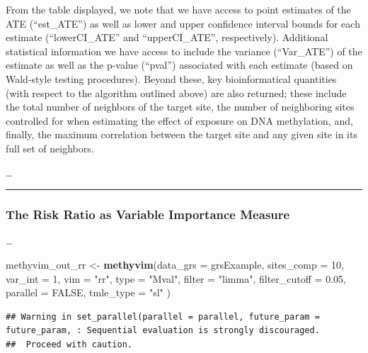 \documentclass[9pt,a4paper,]{extarticle}
\newenvironment{Shaded}{\begin{snugshade}}{\end{snugshade}}
\newcommand{\KeywordTok}[1]{\textcolor[rgb]{0.13,0.29,0.53}{\textbf{#1}}}
\newcommand{\DataTypeTok}[1]{\textcolor[rgb]{0.13,0.29,0.53}{#1}}
\newcommand{\DecValTok}[1]{\textcolor[rgb]{0.00,0.00,0.81}{#1}}
\newcommand{\FloatTok}[1]{\textcolor[rgb]{0.00,0.00,0.81}{#1}}
\newcommand{\StringTok}[1]{\textcolor[rgb]{0.31,0.60,0.02}{#1}}
\newcommand{\OtherTok}[1]{\textcolor[rgb]{0.56,0.35,0.01}{#1}}
\newcommand{\NormalTok}[1]{#1}
\theoremstyle{definition}
\theoremstyle{definition}
\theoremstyle{definition}
\theoremstyle{remark}
\begin{document}
From the table displayed, we note that we have access to point estimates
of the ATE (``est\_ATE'') as well as lower and upper confidence interval
bounds for each estimate (``lowerCI\_ATE'' and ``upperCI\_ATE'',
respectively). Additional statistical information we have access to
include the variance (``Var\_ATE'') of the estimate as well as the
p-value (``pval'') associated with each estimate (based on Wald-style
testing procedures). Beyond these, key bioinformatical quantities (with
respect to the algorithm outlined above) are also returned; these
include the total number of neighbors of the target site, the number of
neighboring sites controlled for when estimating the effect of exposure
on DNA methylation, and, finally, the maximum correlation between the
target site and any given site in its full set of neighbors.

\ldots{}

\begin{center}\rule{0.5\linewidth}{\linethickness}\end{center}

\subsubsection{The Risk Ratio as Variable Importance
Measure}\label{the-risk-ratio-as-variable-importance-measure}

\ldots{}

\begin{Shaded}
\begin{Highlighting}[]
\NormalTok{methyvim_out_rr <-}\StringTok{ }\KeywordTok{methyvim}\NormalTok{(}\DataTypeTok{data_grs =}\NormalTok{ grsExample, }\DataTypeTok{sites_comp =} \DecValTok{10}\NormalTok{,}
                            \DataTypeTok{var_int =} \DecValTok{1}\NormalTok{, }\DataTypeTok{vim =} \StringTok{"rr"}\NormalTok{, }\DataTypeTok{type =} \StringTok{"Mval"}\NormalTok{,}
                            \DataTypeTok{filter =} \StringTok{"limma"}\NormalTok{, }\DataTypeTok{filter_cutoff =} \FloatTok{0.05}\NormalTok{,}
                            \DataTypeTok{parallel =} \OtherTok{FALSE}\NormalTok{, }\DataTypeTok{tmle_type =} \StringTok{"sl"}
\NormalTok{                           )}
\end{Highlighting}
\end{Shaded}

\begin{verbatim}
## Warning in set_parallel(parallel = parallel, future_param = future_param, : Sequential evaluation is strongly discouraged. 
##  Proceed with caution.
\end{verbatim}
\end{document}
